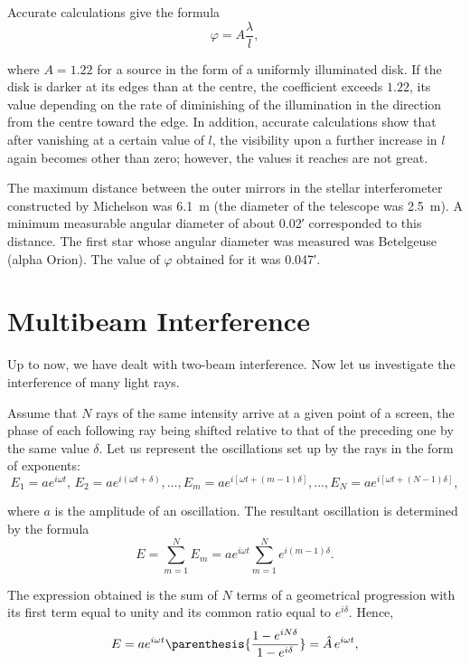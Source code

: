 \noindent
Accurate calculations give the formula
\begin{equation*}
    \varphi = A \frac{\lambda}{l},
\end{equation*}

\noindent
where $A=1.22$ for a source in the form of a uniformly illuminated disk.
If the disk is darker at its edges than at the centre, the coefficient exceeds $1.22$, its value depending on the rate of diminishing of the illumination in the direction from the centre toward the edge.
In addition, accurate calculations show that after vanishing at a certain value of $l$, the visibility upon a further increase in $l$ again
becomes other than zero; however, the values it reaches are not great.

The maximum distance between the outer mirrors in the stellar interferometer constructed by Michelson was \SI{6.1}{\metre} (the diameter
of the telescope was \SI{2.5}{\metre}).
A minimum measurable angular diameter of about \ang{;0.02;} corresponded to this distance.
The first star whose angular diameter was measured was Betelgeuse (alpha Orion).
The value of $\varphi$ obtained for it was \ang{;0.047;}.

\section{Multibeam Interference}\label{sec:17_6}

Up to now, we have dealt with two-beam interference.
Now let us investigate the interference of many light rays.

Assume that $N$ rays of the same intensity arrive at a given point of a screen, the phase of each following ray being shifted relative
to that of the preceding one by the same value $\delta$.
Let us represent the oscillations set up by the rays in the form of exponents:
\begin{equation*}
    E_1 = a e^{i\omega t},\, E_2 = a e^{i(\omega t+\delta)}, \ldots, E_m = a e^{i[\omega t+(m-1)\delta]},\ldots, E_N = a e^{i[\omega t+(N-1)\delta]},
\end{equation*}

\noindent
where $a$ is the amplitude of an oscillation.
The resultant oscillation is determined by the formula
\begin{equation*}
    E = \sum_{m=1}^N E_m = a e^{i\omega t} \sum_{m=1}^N e^{i (m-1) \delta}.
\end{equation*}

\noindent
The expression obtained is the sum of $N$ terms of a geometrical progression with its first term equal to unity and its common ratio equal to $e^{i\delta}$.
Hence,
\begin{equation*}
    E = a e^{i\omega t} \parenthesis{\frac{1 - e^{iN\delta}}{1 - e^{i\delta}}} = \hat{A}\, e^{i\omega t},
\end{equation*}

